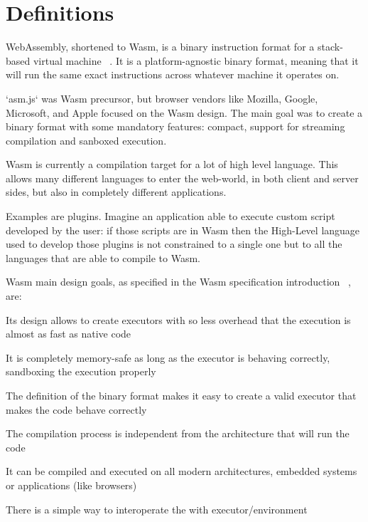 \section{Definitions}

WebAssembly, shortened to Wasm, is a binary instruction format for a stack-based virtual machine ~\cite{wasm-core-spec}. It is a platform-agnostic binary format, meaning that it will run the same exact instructions across whatever machine it operates on. ~\cite{wasm-polkadot-wiki}

`asm.js` was Wasm precursor, but browser vendors like Mozilla, Google, Microsoft, and Apple focused on the Wasm design. The main goal was to create a binary format with some mandatory features: compact, support for streaming compilation and sanboxed execution.

Wasm is currently a compilation target for a lot of high level language. This allows many different languages to enter the web-world, in both client and server sides, but also in completely different applications.

Examples are plugins. Imagine an application able to execute custom script developed by the user: if those scripts are in Wasm then the High-Level language used to develop those plugins is not constrained to a single one but to all the languages that are able to compile to Wasm.

Wasm main design goals, as specified in the Wasm specification introduction ~\cite{wasm-core-spec}, are:
\begin{description}[font=$\bullet$ \scshape\bfseries]
  \item[Fast] Its design allows to create executors with so less overhead that the execution is almost as fast as native code
  \item[Safe] It is completely memory-safe as long as the executor is  behaving correctly, sandboxing the execution properly
  \item[Well-defined] The definition of the binary format makes it easy to create a valid executor that makes the code behave correctly
  \item[Hardware-independent] The compilation process is independent from the architecture that will run the code
  \item[Platform-independent] It can be compiled and executed on all modern architectures, embedded systems or applications (like browsers)
  \item[Open] There is a simple way to interoperate the with executor/environment
\end{description}

